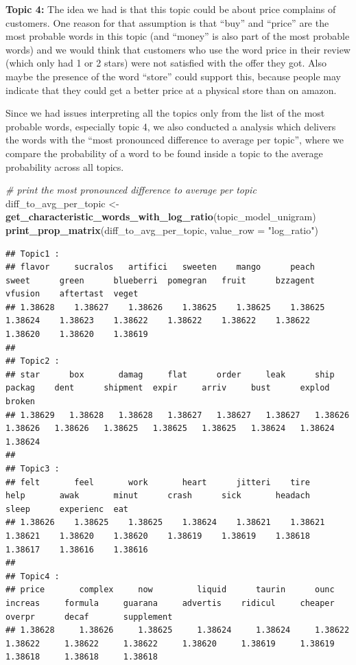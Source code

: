 \documentclass[
]{article}
\newenvironment{Shaded}{\begin{snugshade}}{\end{snugshade}}
\newcommand{\AttributeTok}[1]{\textcolor[rgb]{0.13,0.29,0.53}{#1}}
\newcommand{\CommentTok}[1]{\textcolor[rgb]{0.56,0.35,0.01}{\textit{#1}}}
\newcommand{\FunctionTok}[1]{\textcolor[rgb]{0.13,0.29,0.53}{\textbf{#1}}}
\newcommand{\NormalTok}[1]{#1}
\newcommand{\OtherTok}[1]{\textcolor[rgb]{0.56,0.35,0.01}{#1}}
\newcommand{\StringTok}[1]{\textcolor[rgb]{0.31,0.60,0.02}{#1}}
\begin{document}
\textbf{Topic 4:} The idea we had is that this topic could be about
price complains of customers. One reason for that assumption is that
``buy'' and ``price'' are the most probable words in this topic (and
``money'' is also part of the most probable words) and we would think
that customers who use the word price in their review (which only had 1
or 2 stars) were not satisfied with the offer they got. Also maybe the
presence of the word ``store'' could support this, because people may
indicate that they could get a better price at a physical store than on
amazon.

Since we had issues interpreting all the topics only from the list of
the most probable words, especially topic 4, we also conducted a
analysis which delivers the words with the ``most pronounced difference
to average per topic'', where we compare the probability of a word to be
found inside a topic to the average probability across all topics.

\tiny

\begin{Shaded}
\begin{Highlighting}[]
\CommentTok{\# print the most pronounced difference to average per topic}
\NormalTok{diff\_to\_avg\_per\_topic }\OtherTok{\textless{}{-}} \FunctionTok{get\_characteristic\_words\_with\_log\_ratio}\NormalTok{(topic\_model\_unigram)}
\FunctionTok{print\_prop\_matrix}\NormalTok{(diff\_to\_avg\_per\_topic, }\AttributeTok{value\_row =} \StringTok{"log\_ratio"}\NormalTok{)}
\end{Highlighting}
\end{Shaded}

\begin{verbatim}
## Topic1 :
## flavor     sucralos   artifici   sweeten    mango      peach      sweet      green      blueberri  pomegran   fruit      bzzagent   vfusion    aftertast  veget      
## 1.38628    1.38627    1.38626    1.38625    1.38625    1.38625    1.38624    1.38623    1.38622    1.38622    1.38622    1.38622    1.38620    1.38620    1.38619    
## 
## Topic2 :
## star      box       damag     flat      order     leak      ship      packag    dent      shipment  expir     arriv     bust      explod    broken    
## 1.38629   1.38628   1.38628   1.38627   1.38627   1.38627   1.38626   1.38626   1.38626   1.38625   1.38625   1.38625   1.38624   1.38624   1.38624   
## 
## Topic3 :
## felt       feel       work       heart      jitteri    tire       help       awak       minut      crash      sick       headach    sleep      experienc  eat        
## 1.38626    1.38625    1.38625    1.38624    1.38621    1.38621    1.38621    1.38620    1.38620    1.38619    1.38619    1.38618    1.38617    1.38616    1.38616    
## 
## Topic4 :
## price       complex     now         liquid      taurin      ounc        increas     formula     guarana     advertis    ridicul     cheaper     overpr      decaf       supplement  
## 1.38628     1.38626     1.38625     1.38624     1.38624     1.38622     1.38622     1.38622     1.38622     1.38620     1.38619     1.38619     1.38618     1.38618     1.38618
\end{verbatim}
\end{document}
